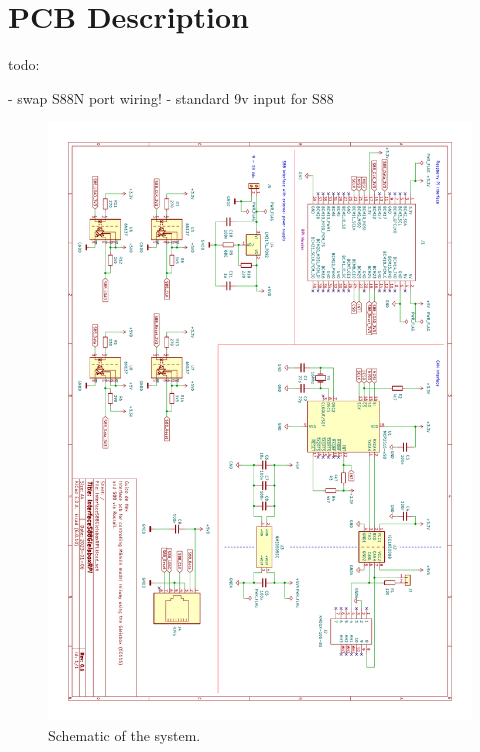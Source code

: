 \section{PCB Description}

todo:

- swap S88N port wiring! 
- standard 9v input for S88

\begin{figure}[h!]
	\centering
	\includegraphics[width=1.00\linewidth]{../../pcb/InterfaceS88GleisboxRPi/InterfaceS88GleisboxRPi.pdf}
	\caption{Schematic of the system.}
	\label{fig:pcbschematic}
\end{figure}
